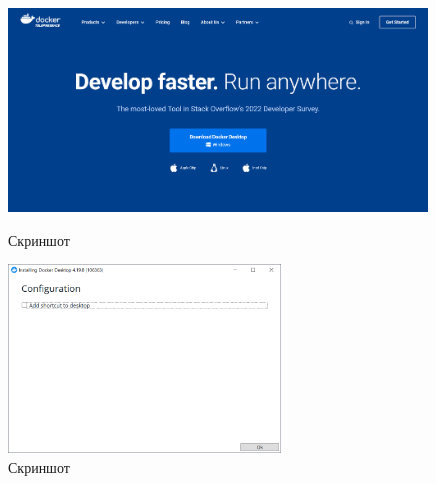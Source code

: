 \begin{figure}[!phtb]
    \centering

    \begin{minipage}{0.49\textwidth}
        \centering

        \includegraphics[width=0.99\textwidth]
        {images/install/docker/1.png}

        \caption{Скриншот}

        \label{fig:docker_1}
    \end{minipage}
    \begin{minipage}{0.49\textwidth}
        \centering

        \includegraphics[height=5cm]
        {images/install/docker/2.png}

        \caption{Скриншот}

        \label{fig:docker_2}
    \end{minipage}
\end{figure}

